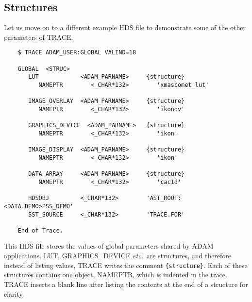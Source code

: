 \subsection{Structures}
Let us move on to a different example HDS file to demonstrate some of
the other parameters of {\small TRACE}.
\small
\begin{verbatim}
    $ TRACE ADAM_USER:GLOBAL VALIND=18 
  
    GLOBAL  <STRUC>
       LUT            <ADAM_PARNAME>     {structure}
          NAMEPTR        <_CHAR*132>        'xmascomet_lut' 

       IMAGE_OVERLAY  <ADAM_PARNAME>     {structure} 
          NAMEPTR        <_CHAR*132>        'ikonov' 

       GRAPHICS_DEVICE  <ADAM_PARNAME>   {structure}
          NAMEPTR        <_CHAR*132>        'ikon' 

       IMAGE_DISPLAY  <ADAM_PARNAME>     {structure}
          NAMEPTR        <_CHAR*132>        'ikon' 

       DATA_ARRAY     <ADAM_PARNAME>     {structure}
          NAMEPTR        <_CHAR*132>        'cac1d' 

       HDSOBJ         <_CHAR*132>        'AST_ROOT:<DATA.DEMO>PSS_DEMO' 
       SST_SOURCE     <_CHAR*132>        'TRACE.FOR' 
                                                                             
    End of Trace.
\end{verbatim}
\normalsize
This HDS file stores the values of global parameters shared by ADAM
applications.  LUT, GRAPHICS\_DEVICE {\it etc.}\ are structures, and
therefore instead of listing values, {\small TRACE} writes the
comment {\tt \{structure\}}.  Each of these structures contains one
object, NAMEPTR, which is indented in the trace.  {\small TRACE} inserts
a blank line after listing the contents at the end of a structure for
clarity. 

